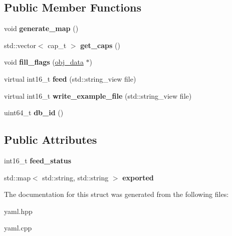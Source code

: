 \subsection*{Public Member Functions}
\begin{DoxyCompactItemize}
\item 
\mbox{\label{structmods_1_1yaml_1_1attachment__description__t_a7fb39d3e24b4e0fc8266b8fdba6ec828}} 
void {\bfseries generate\+\_\+map} ()
\item 
\mbox{\label{structmods_1_1yaml_1_1attachment__description__t_ac8cb8cc7675d7ab535a0a68b536e0e8c}} 
std\+::vector$<$ cap\+\_\+t $>$ {\bfseries get\+\_\+caps} ()
\item 
\mbox{\label{structmods_1_1yaml_1_1attachment__description__t_a54dcfea0b789f7d94b9ccab0b67c687e}} 
void {\bfseries fill\+\_\+flags} (\hyperlink{structobj__data}{obj\+\_\+data} $\ast$)
\item 
\mbox{\label{structmods_1_1yaml_1_1attachment__description__t_ab71c28649f5276ca15f877ccb834417d}} 
virtual int16\+\_\+t {\bfseries feed} (std\+::string\+\_\+view file)
\item 
\mbox{\label{structmods_1_1yaml_1_1attachment__description__t_af37aec16e4306e21e308b015d757881e}} 
virtual int16\+\_\+t {\bfseries write\+\_\+example\+\_\+file} (std\+::string\+\_\+view file)
\item 
\mbox{\label{structmods_1_1yaml_1_1attachment__description__t_ae315d812ad08646a78aab267b6bae997}} 
uint64\+\_\+t {\bfseries db\+\_\+id} ()
\end{DoxyCompactItemize}
\subsection*{Public Attributes}
\begin{DoxyCompactItemize}
\item 
\mbox{\label{structmods_1_1yaml_1_1attachment__description__t_afe366f8ab2633d017dc61edfbae41b62}} 
int16\+\_\+t {\bfseries feed\+\_\+status}
\item 
\mbox{\label{structmods_1_1yaml_1_1attachment__description__t_a34081599a1af7731138a47c44fb2e195}} 
std\+::map$<$ std\+::string, std\+::string $>$ {\bfseries exported}
\end{DoxyCompactItemize}


The documentation for this struct was generated from the following files\+:\begin{DoxyCompactItemize}
\item 
yaml.\+hpp\item 
yaml.\+cpp\end{DoxyCompactItemize}
